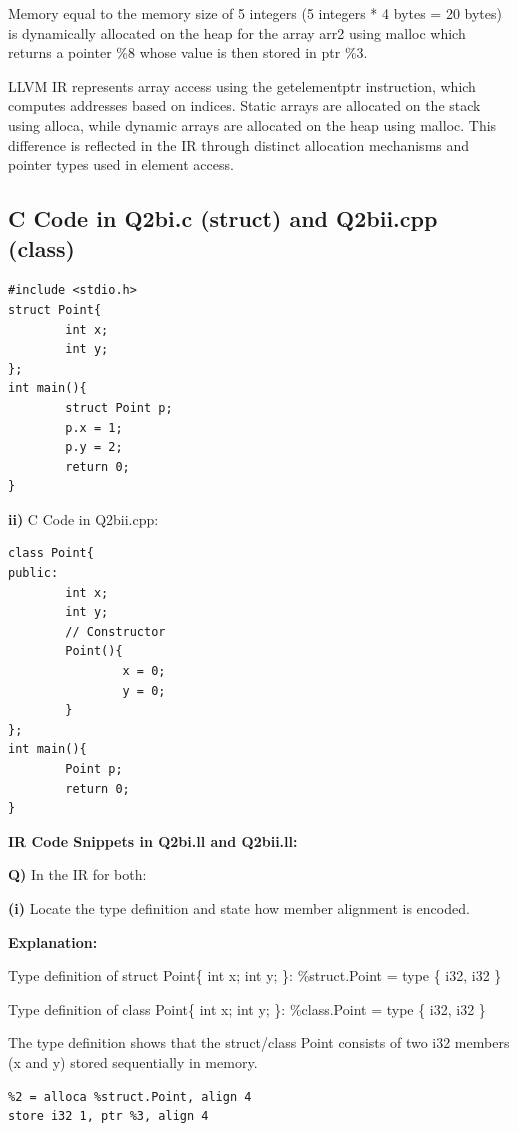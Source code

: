 Memory equal to the memory size of 5 integers (5 integers * 4 bytes = 20 bytes) is dynamically allocated on the heap for the array arr2 using malloc which returns a pointer \%8 whose value is then stored in ptr \%3.


LLVM IR represents array access using the getelementptr instruction, which computes addresses based on indices. Static arrays are allocated on the stack using alloca, while dynamic arrays are allocated on the heap using malloc. This difference is reflected in the IR through distinct allocation mechanisms and pointer types used in element access. 


\subsection{C Code in Q2bi.c (struct) and Q2bii.cpp (class)}

\begin{lstlisting}
#include <stdio.h>
struct Point{
        int x;
        int y;
};
int main(){
        struct Point p;
        p.x = 1;
        p.y = 2;
        return 0;
}
\end{lstlisting}

\textbf{ii)} C Code in Q2bii.cpp: 


\begin{lstlisting}
class Point{
public:
        int x;
        int y;
        // Constructor
        Point(){
                x = 0;
                y = 0;
        }
};
int main(){
        Point p;
        return 0;
}
\end{lstlisting}

\medskip\noindent\textbf{IR Code Snippets in Q2bi.ll and Q2bii.ll:}\par

\textbf{Q)} In the IR for both:


\textbf{(i)} Locate the type definition and state how member alignment is encoded.


\textbf{Explanation:}


Type definition of struct Point\{ int x; int y; \}: \%struct.Point = type \{ i32, i32 \}


Type definition of class Point\{ int x; int y; \}:  \%class.Point = type \{ i32, i32 \}


The type definition shows that the struct/class Point consists of two i32 members (x and y) stored sequentially in memory. 


\begin{lstlisting}
%2 = alloca %struct.Point, align 4
store i32 1, ptr %3, align 4
\end{lstlisting}

